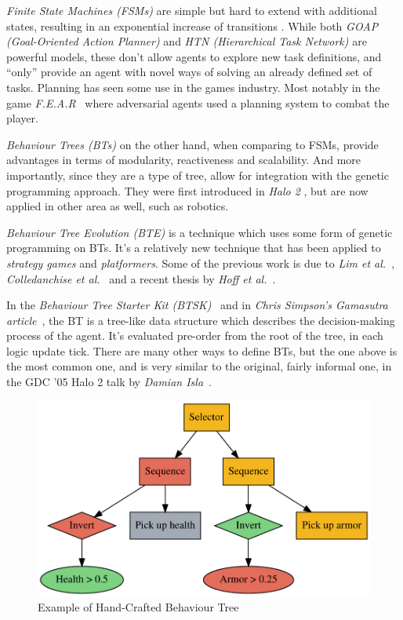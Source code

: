 \documentclass[a4paper, twocolumn]{article}
\begin{document}
        \emph{Finite State Machines (FSMs)} are simple but hard to extend with additional states, resulting in an exponential increase of transitions \cite{dawe2014overview}. While both \emph{GOAP (Goal-Oriented Action Planner)} and \emph{HTN (Hierarchical Task Network)} are powerful models, these don't allow agents to explore new task definitions, and ``only'' provide an agent with novel ways of solving an already defined set of tasks. Planning has seen some use in the games industry. Most notably in the game \textit{F.E.A.R}~\cite{orkin2006three} where adversarial agents used a planning system to combat the player.

        \emph{Behaviour Trees (BTs)} on the other hand, when comparing to FSMs, provide advantages in terms of modularity, reactiveness and scalability. And more importantly, since they are a type of tree, allow for integration with the genetic programming approach. They were first introduced in \emph{Halo 2} \cite{isla2005managing}, but are now applied in other area as well, such as robotics.

        \emph{Behaviour Tree Evolution (BTE)} is a technique which uses some form of genetic programming on BTs. It's a relatively new technique that has been applied to \emph{strategy games} and \emph{platformers}. Some of the previous work is due to \emph{Lim et al.}~\cite{lim2010evolving}, \emph{Colledanchise et al.}~\cite{colledanchise2015learning} and a recent thesis by \emph{Hoff et al.}~\cite{hoff2016evolving}.

        In the \emph{Behaviour Tree Starter Kit (BTSK)}~\cite{champandard2014behaviour} and in \emph{Chris Simpson's Gamasutra article}~\cite{simpson2014behavior}, the BT is a tree-like data structure which describes the decision-making process of the agent. It's evaluated pre-order from the root of the tree, in each logic update tick. There are many other ways to define BTs, but the one above is the most common one, and is very similar to the original, fairly informal one, in the GDC '05 Halo 2 talk by \emph{Damian Isla}~\cite{isla2005managing}.

        \begin{figure}[H]
            \centering
            \includegraphics[width=\linewidth]{share/behaviour_tree.pdf}
            \caption{Example of Hand-Crafted Behaviour Tree}
            \label{fig:behaviour_tree}
        \end{figure}
\end{document}
